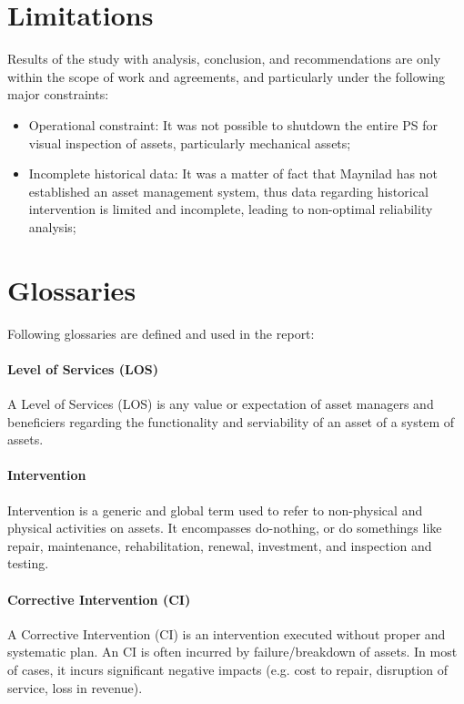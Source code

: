 \section{Limitations}
Results of the study with analysis, conclusion, and recommendations are only within the scope of work and agreements, and particularly under the following major constraints:
\begin{itemize}
\item Operational constraint: It was not possible to shutdown the entire PS for visual inspection of assets, particularly mechanical assets;
\item Incomplete historical data: It was a matter of fact that Maynilad has not established an asset management system, thus data regarding historical intervention is limited and incomplete, leading to non-optimal reliability analysis; 
\end{itemize}

\section{Glossaries}
Following glossaries are defined and used in the report:

\paragraph{\textbf{Level of Services (LOS)}}
A Level of Services (LOS) is any value or expectation of asset managers and beneficiers regarding the functionality and serviability of an asset of a system of assets.

\paragraph{\textbf{Intervention}}
Intervention is a generic and global term used to refer to non-physical and physical activities on assets. It encompasses do-nothing, or do somethings like repair, maintenance, rehabilitation, renewal, investment, and inspection and testing.

\paragraph{\textbf{Corrective Intervention (CI)}}
A Corrective Intervention (CI) is an intervention executed without proper and systematic plan. An CI is often incurred by failure/breakdown of assets. In most of cases, it incurs significant negative impacts (e.g. cost to repair, disruption of service, loss in revenue).

